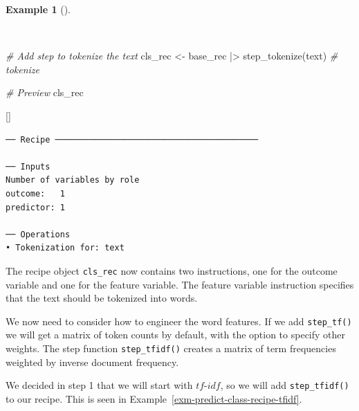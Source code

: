\documentclass[
  letterpaper,
  krantz1]{latex/krantz-mod}
\newenvironment{Shaded}{\begin{snugshade}}{\end{snugshade}}
\newcommand{\CommentTok}[1]{\textcolor[rgb]{0.00,0.00,0.00}{\textit{#1}}}
\newcommand{\FunctionTok}[1]{\textcolor[rgb]{0.00,0.00,0.00}{#1}}
\newcommand{\NormalTok}[1]{\textcolor[rgb]{0.00,0.00,0.00}{#1}}
\newcommand{\OtherTok}[1]{\textcolor[rgb]{0.00,0.00,0.00}{#1}}
\newcommand{\SpecialCharTok}[1]{\textcolor[rgb]{0.00,0.00,0.00}{#1}}
\newcommand{\cindex}[1]{%
  \StrSubstitute{#1}{_}{\_}[\temp]%
  \index{\temp}%
}
\theoremstyle{definition}
\theoremstyle{definition}
\newtheorem{example}{Example}[chapter]
\theoremstyle{remark}
\begin{document}
\begin{example}[]\protect\hypertarget{exm-predict-class-recipe-tokenize}{}\label{exm-predict-class-recipe-tokenize}

~

\begin{Shaded}
\begin{Highlighting}[numbers=left,,]
\CommentTok{\# Add step to tokenize the text}
\NormalTok{cls\_rec }\OtherTok{\textless{}{-}}
\NormalTok{  base\_rec }\SpecialCharTok{|\textgreater{}}
  \FunctionTok{step\_tokenize}\NormalTok{(text) }\CommentTok{\# tokenize}

\CommentTok{\# Preview}
\NormalTok{cls\_rec}
\end{Highlighting}
\end{Shaded}

\cindex{step_tokenize()}

\vspace{1em}

\begin{verbatim}
── Recipe ─────────────────────────────────────────

── Inputs
Number of variables by role
outcome:   1
predictor: 1

── Operations
• Tokenization for: text
\end{verbatim}

\end{example}

The recipe object \texttt{cls\_rec} now contains two instructions, one
for the outcome variable and one for the feature variable. The feature
variable instruction specifies that the text should be tokenized into
words.

We now need to consider how to engineer the word features. If we add
\texttt{step\_tf()} we will get a matrix of token counts by
default, with the option to specify other weights. The
step function \texttt{step\_tfidf()} creates a matrix of term
frequencies weighted by inverse document
frequency.

We decided in step 1 that we will start with
\(tf\)-\(idf\),
so we will add \texttt{step\_tfidf()} to our recipe. This is seen in
Example~\ref{exm-predict-class-recipe-tfidf}.
\end{document}
